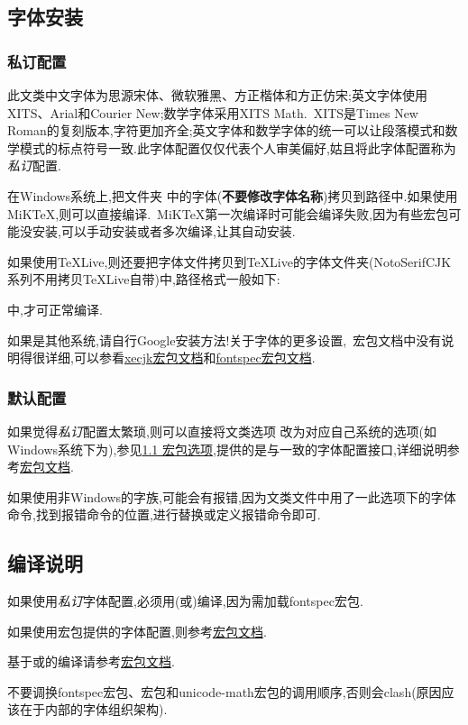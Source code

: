 \documentclass[list,answers,csize4,custom]{sysuexam}
\begin{document}
\subsection{字体安装}
\subsubsection{私订配置}
此文类中文字体为思源宋体、微软雅黑、方正楷体和方正仿宋;英文字体使用XITS、Arial和Courier New;数学字体采用XITS Math.~XITS是Times New Roman的复刻版本,字符更加齐全;英文字体和数学字体的统一可以让段落模式和数学模式的标点符号一致.此字体配置仅仅代表个人审美偏好,姑且将此字体配置称为\textit{私订}配置.

在Windows系统上,把文件夹  中的字体(\textbf{不要修改字体名称})拷贝到路径中.如果使用MiK\TeX{},则可以直接编译.~MiK\TeX{}第一次编译时可能会编译失败,因为有些宏包可能没安装,可以手动安装或者多次编译,让其自动安装.

如果使用\TeX{}Live,则还要把字体文件拷贝到\TeX{}Live的字体文件夹(NotoSerifCJK系列不用拷贝\TeX{}Live自带)中,路径格式一般如下:\par
{}\par
\noindent 中,才可正常编译.

如果是其他系统,请自行Google安装方法!关于字体的更多设置,~\CTeX{}宏包文档中没有说明得很详细,可以参看\href{http://mirrors.ctan.org/macros/xetex/latex/xecjk/xeCJK.pdf}{xecjk宏包文档}和\href{http://mirrors.ctan.org/macros/unicodetex/latex/fontspec/fontspec.pdf}{fontspec宏包文档}.

\subsubsection{默认配置}
如果觉得\textit{私订}配置太繁琐,则可以直接将文类选项  改为对应自己系统的选项(如Windows系统下为),参见\hyperlink{hbxx}{1.1 宏包选项},提供的是与\CTeX{}一致的字体配置接口,详细说明参考\href{http://mirrors.ctan.org/language/chinese/ctex/ctex.pdf}{\CTeX{}宏包文档}.

如果使用非Windows的字族,可能会有报错,因为文类文件中用了一此选项下的字体命令,找到报错命令的位置,进行替换或定义报错命令即可.

\subsection{编译说明}
\begin{compactitem}
    \item 如果使用\textit{私订}字体配置,必须用(或)编译,因为需加载fontspec宏包.
    \item 如果使用\CTeX{}宏包提供的字体配置,则参考\href{http://mirrors.ctan.org/language/chinese/ctex/ctex.pdf}{\CTeX{}宏包文档}.
    \item 基于或的编译请参考\href{http://mirrors.ctan.org/language/chinese/ctex/ctex.pdf}{\CTeX{}宏包文档}.
    \item 不要调换fontspec宏包、\CTeX{}宏包和unicode-math宏包的调用顺序,否则会clash(原因应该在于内部的字体组织架构).
\end{compactitem}
\end{document}
